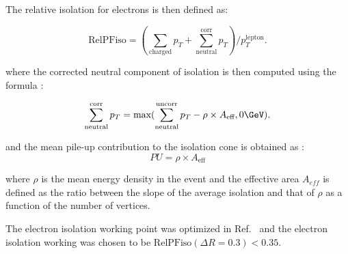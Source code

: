 The relative isolation for electrons is then defined as: 

\begin{equation}
\text{RelPFiso} = (\sum_{\text{charged}} p_T + \sum^{\text{corr}}_{\text{neutral}} p_T)/p_T^{\text{lepton}}  .
\label{eqn:elepfrelisoeqn}
\end{equation} 

where the corrected neutral component of isolation is then computed using the formula :

\begin{equation}
\label{eqn:neutralea}
  \sum^{\text{corr}}_{\text{neutral}} p_T = \text{max}(\sum^{\text{uncorr}}_{\text{neutral}} p_T - \rho \times A_\text{eff},0 \GeV)  .
\end{equation}

and the mean pile-up contribution to the isolation cone is obtained as :  
\begin{equation}
 PU =  \rho \times A_\text{eff}
\label{eqn:purho}
\end{equation}

where $\rho$ is the mean energy density in the event and the effective area $A_{eff}$ is defined as the ratio
between the slope of the average isolation and that of $\rho$ as a function of the number of vertices. 

The electron isolation working point was optimized in Ref.~\cite{AN-15-277} and the electron isolation working was 
chosen to be $\text{RelPFiso}(\Delta R = 0.3) < 0.35$. 
